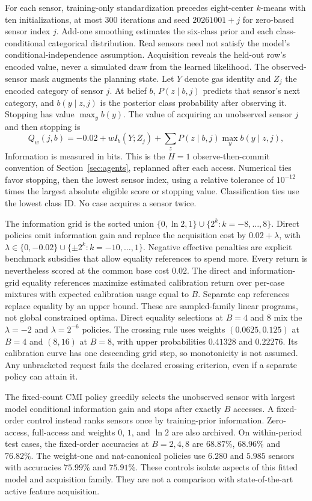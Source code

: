 \documentclass[runningheads]{llncs}
\begin{document}
For each sensor, training-only standardization precedes eight-center $k$-means with ten initializations, at most $300$ iterations and seed $20261001+j$ for zero-based sensor index $j$. Add-one smoothing estimates the six-class prior and each class-conditional categorical distribution. Real sensors need not satisfy the model's conditional-independence assumption. Acquisition reveals the held-out row's encoded value, never a simulated draw from the learned likelihood. The observed-sensor mask augments the planning state. Let $Y$ denote gas identity and $Z_j$ the encoded category of sensor $j$. At belief $b$, $P(z\mid b,j)$ predicts that sensor's next category, and $b(y\mid z,j)$ is the posterior class probability after observing it. Stopping has value $\max_y b(y)$. The value of acquiring an unobserved sensor $j$ and then stopping is
\[
Q_w(j,b)=-0.02+wI_b(Y;Z_j)+\sum_z P(z\mid b,j)\max_y b(y\mid z,j),
\]
Information is measured in bits. This is the $H=1$ observe-then-commit convention of Section~\ref{sec:agents}, replanned after each access. Numerical ties favor stopping, then the lowest sensor index, using a relative tolerance of $10^{-12}$ times the largest absolute eligible score or stopping value. Classification ties use the lowest class ID. No case acquires a sensor twice.

The information grid is the sorted union $\{0,\ln2,1\}\cup\{2^k:k=-8,\ldots,8\}$. Direct policies omit information gain and replace the acquisition cost by $0.02+\lambda$, with $\lambda\in\{0,-0.02\}\cup\{\pm2^k:k=-10,\ldots,1\}$. Negative effective penalties are explicit benchmark subsidies that allow equality references to spend more. Every return is nevertheless scored at the common base cost $0.02$. The direct and information-grid equality references maximize estimated calibration return over per-case mixtures with expected calibration usage equal to $B$. Separate cap references replace equality by an upper bound. These are sampled-family linear programs, not global constrained optima. Direct equality selections at $B=4$ and $8$ mix the $\lambda=-2$ and $\lambda=2^{-6}$ policies. The crossing rule uses weights $(0.0625,0.125)$ at $B=4$ and $(8,16)$ at $B=8$, with upper probabilities $0.41328$ and $0.22276$. Its calibration curve has one descending grid step, so monotonicity is not assumed. Any unbracketed request fails the declared crossing criterion, even if a separate policy can attain it.

The fixed-count CMI policy greedily selects the unobserved sensor with largest model conditional information gain and stops after exactly $B$ accesses. A fixed-order control instead ranks sensors once by training-prior information. Zero-access, full-access and weights $0$, $1$, and $\ln2$ are also archived. On within-period test cases, the fixed-order accuracies at $B=2,4,8$ are $68.87\%$, $68.96\%$ and $76.82\%$. The weight-one and nat-canonical policies use $6.280$ and $5.985$ sensors with accuracies $75.99\%$ and $75.91\%$. These controls isolate aspects of this fitted model and acquisition family. They are not a comparison with state-of-the-art active feature acquisition.
\end{document}
